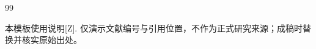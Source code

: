 \renewcommand{\refname}{\texorpdfstring{\chinese{section}、\quad 参考文献}{参考文献}}
\begin{thebibliography}{99}
\small
\raggedright
{} 本模板使用说明[Z]. 仅演示文献编号与引用位置，不作为正式研究来源；成稿时替换并核实原始出处。
\end{thebibliography}

